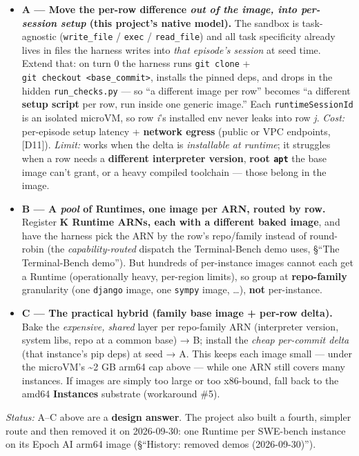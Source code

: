 \documentclass[
  paper=a4,
  ,captions=tableheading
]{scrartcl}
\providecommand{\tightlist}{%
  \setlength{\itemsep}{0pt}\setlength{\parskip}{0pt}}
\begin{document}
\begin{itemize}
\tightlist
\item
  \textbf{A --- Move the per-row difference \emph{out of the image, into
  per-session setup} (this project's native model).} The sandbox is
  task-agnostic (\texttt{write\_file} / \texttt{exec} /
  \texttt{read\_file}) and all task specificity already lives in files
  the harness writes into \emph{that episode's session} at seed time.
  Extend that: on turn 0 the harness runs \texttt{git\ clone} +
  \texttt{git\ checkout\ \textless{}base\_commit\textgreater{}},
  installs the pinned deps, and drops in the hidden
  \texttt{run\_checks.py} --- so ``a different image per row'' becomes
  ``a different \textbf{setup script} per row, run inside one generic
  image.'' Each \texttt{runtimeSessionId} is an isolated microVM, so row
  \emph{i}'s installed env never leaks into row \emph{j}. \emph{Cost:}
  per-episode setup latency + \textbf{network egress} (public or VPC
  endpoints, {[}D11{]}). \emph{Limit:} works when the delta is
  \emph{installable at runtime}; it struggles when a row needs a
  \textbf{different interpreter version}, \textbf{root \texttt{apt}} the
  base image can't grant, or a heavy compiled toolchain --- those belong
  in the image.
\item
  \textbf{B --- A \emph{pool} of Runtimes, one image per ARN, routed by
  row.} Register \textbf{K Runtime ARNs, each with a different baked
  image}, and have the harness pick the ARN by the row's repo/family
  instead of round-robin (the \emph{capability-routed} dispatch the
  Terminal-Bench demo uses, §``The Terminal-Bench demo''). But hundreds
  of per-instance images cannot each get a Runtime (operationally heavy,
  per-region limits), so group at \textbf{repo-family} granularity (one
  \texttt{django} image, one \texttt{sympy} image, \ldots), \textbf{not}
  per-instance.
\item
  \textbf{C --- The practical hybrid (family base image + per-row
  delta).} Bake the \emph{expensive, shared} layer per repo-family ARN
  (interpreter version, system libs, repo at a common base) → B; install
  the \emph{cheap per-commit delta} (that instance's pip deps) at seed →
  A. This keeps each image small --- under the microVM's
  \textasciitilde2 GB arm64 cap above --- while one ARN still covers
  many instances. If images are simply too large or too x86-bound, fall
  back to the amd64 \textbf{Instances} substrate (workaround \#5).
\end{itemize}

\emph{Status:} A--C above are a \textbf{design answer}. The project also
built a fourth, simpler route and then removed it on 2026-09-30: one
Runtime per SWE-bench instance on its Epoch AI arm64 image (§``History:
removed demos (2026-09-30)'').
\end{document}
